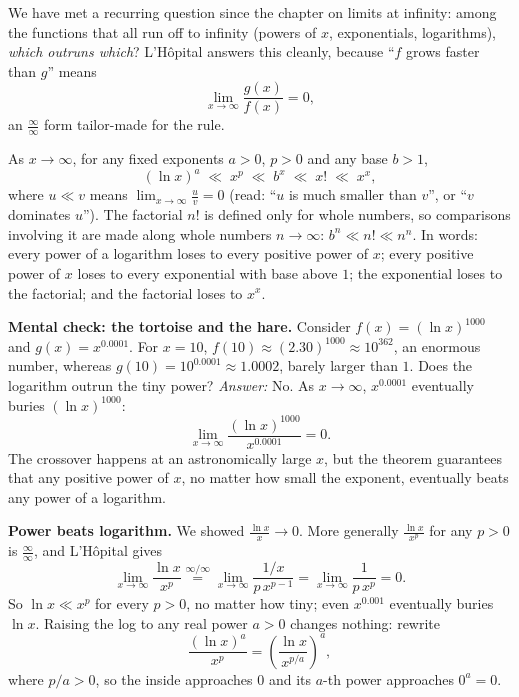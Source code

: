 We have met a recurring question since the chapter on limits at
infinity: among the functions that all run off to infinity (powers of $x$,
exponentials, logarithms), \emph{which outruns which}? L'H\^opital answers this
cleanly, because ``$f$ grows faster than $g$'' means
\[
\lim_{x\to\infty}\frac{g(x)}{f(x)}=0,
\]
an $\tfrac{\infty}{\infty}$ form tailor-made for the rule.

\begin{theorem}\label{ch18:thm-growth}
As $x\to\infty$, for any fixed exponents $a>0$, $p>0$ and any base $b>1$,
\[
(\ln x)^{a}\;\ll\; x^{p}\;\ll\; b^{x}\;\ll\; x!\;\ll\; x^{x},
\]
where $u\ll v$ means $\lim_{x\to\infty}\tfrac{u}{v}=0$ (read: ``$u$ is much smaller than
$v$'', or ``$v$ dominates $u$''). The factorial $n!$ is defined only for whole numbers,
so comparisons involving it are made along whole numbers $n\to\infty$:
$b^n \ll n! \ll n^n$.
In words: every power of a logarithm loses to every positive power of $x$; every
positive power of $x$ loses to every exponential with base above $1$; the exponential
loses to the factorial; and the factorial loses to $x^x$.
\end{theorem}

\begin{recoverybox}
\textbf{Mental check: the tortoise and the hare.}
Consider $f(x) = (\ln x)^{1000}$ and $g(x) = x^{0.0001}$.
For $x = 10$, $f(10) \approx (2.30)^{1000} \approx 10^{362}$, an enormous
number, whereas $g(10) = 10^{0.0001} \approx 1.0002$, barely larger than $1$.
Does the logarithm outrun the tiny power?
\emph{Answer:} No. As $x\to\infty$, $x^{0.0001}$ eventually buries
$(\ln x)^{1000}$:
\[
\lim_{x\to\infty} \frac{(\ln x)^{1000}}{x^{0.0001}} = 0.
\]
The crossover happens at an astronomically large $x$, but the theorem
guarantees that any positive power of $x$, no matter how small the exponent,
eventually beats any power of a logarithm.
\end{recoverybox}

\begin{focusbox}
\textbf{Power beats logarithm.} We showed $\tfrac{\ln x}{x}\to 0$. More generally
$\tfrac{\ln x}{x^p}$ for any $p>0$ is $\tfrac{\infty}{\infty}$, and L'H\^opital gives
\[
\lim_{x\to\infty}\frac{\ln x}{x^p}\overset{\infty/\infty}{=}
\lim_{x\to\infty}\frac{1/x}{p\,x^{p-1}}=\lim_{x\to\infty}\frac{1}{p\,x^{p}}=0.
\] So $\ln x\ll x^p$ for every $p>0$,
no matter how tiny; even $x^{0.001}$ eventually buries $\ln x$. Raising the log to any
real power $a>0$ changes nothing: rewrite
\[
\frac{(\ln x)^a}{x^p} = \left(\frac{\ln x}{x^{p/a}}\right)^{a},
\]
where $p/a>0$, so the
inside approaches $0$ and its $a$-th power approaches $0^a=0$.
\end{focusbox}

